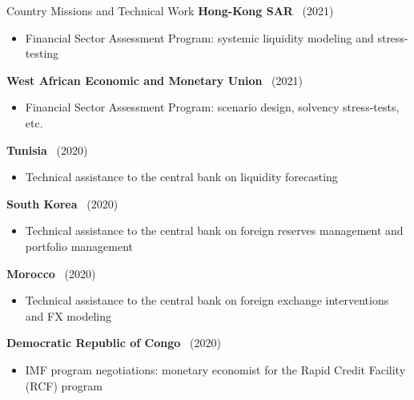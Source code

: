 \documentclass[usegeometry, 10pt, a4paper]{cv} %
\newcommand{\activite}[1]{\textbf{#1}\ }
\newcommand{\midreduce}{-0.5cm}
\begin{document}
\begin{rubriquetableau}[0.95\textwidth]{Country Missions and Technical Work}
  \activite{Hong-Kong SAR} (2021)\\
  \vspace{\midreduce}
  \begin{itemize}[label={}]
    \item \small{Financial Sector Assessment Program: systemic liquidity modeling and stress-testing}
  \end{itemize}

  \activite{West African Economic and Monetary Union} (2021)\\
  \vspace{\midreduce}
  \begin{itemize}[label={}]
    \item \small{Financial Sector Assessment Program: scenario design, solvency stress-tests, etc.}
  \end{itemize}

  \activite{Tunisia} (2020)\\
  \vspace{\midreduce}
  \begin{itemize}[label={}]
    \item \small{Technical assistance to the central bank on liquidity forecasting}
  \end{itemize}

  \activite{South Korea} (2020)\\
  \vspace{\midreduce}
  \begin{itemize}[label={}]
    \item \small{Technical assistance to the central bank on foreign reserves
        management and portfolio management}
  \end{itemize}

  \activite{Morocco} (2020)\\
  \vspace{\midreduce}
  \begin{itemize}[label={}]
    \item \small{Technical assistance to the central bank on foreign exchange
        interventions and FX modeling}
  \end{itemize}

  \activite{Democratic Republic of Congo} (2020)\\
  \vspace{\midreduce}
  \begin{itemize}[label={}]
    \item \small{IMF program negotiations: monetary economist for the Rapid
        Credit Facility (RCF) program}
  \end{itemize}


\end{rubriquetableau}
\end{document}
